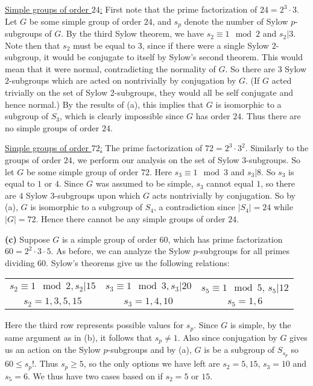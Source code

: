 \documentclass[11pt, letterpaper]{article}
\begin{document}
\underline{Simple groups of order $24$:} First note that the prime factorization of $24=2^3\cdot 3$. Let $G$ be some simple group of order $24$, and $s_p$ denote the number of Sylow $p$-subgroups of $G$. By the third Sylow theorem, we have $s_2\equiv 1\mod 2$ and $s_2 | 3$. Note then that $s_2$ must be equal to $3$, since if there were a single Sylow $2$-subgroup, it would be conjugate to itself by Sylow's second theorem. This would mean that it were normal, contradicting the normality of $G$. So there are $3$ Sylow $2$-subgroups which are acted on nontrivially by conjugation by $G$. (If $G$ acted trivially on the set of Sylow 2-subgroups, they would all be self conjugate and hence normal.) By the results of (a), this implies that $G$ is isomorphic to a subgroup of $S_3$, which is clearly impossible since $G$ has order $24$. Thus there are no simple groups of order $24$.

\underline{Simple groups of order $72$:} The prime factorization of $72=2^3\cdot3^2$. Similarly to the groups of order $24$, we perform our analysis on the set of Sylow $3$-subgroups. So let $G$ be some simple group of order $72$. Here $s_3\equiv 1\mod 3$ and $s_3|8$. So $s_3$ is equal to $1$ or $4$. Since $G$ was assumed to be simple, $s_3$ cannot equal $1$, so there are $4$ Sylow $3$-subgroups upon which $G$ acts nontrivially by conjugation. So by (a), $G$ is isomorphic to a subgroup of $S_4$, a contradiction since $|S_4|=24$ while $|G|=72$. Hence there cannot be any simple groups of order $24$.

\textbf{(c)} Suppose $G$ is a simple group of order $60$, which has prime factorization $60=2^2\cdot 3\cdot 5$. As before, we can analyze the Sylow $p$-subgroups for all primes dividing $60$. Sylow's theorems give us the following relations:

\begin{center}
    \begin{tabular}{ c c c }
         $s_2\equiv 1\mod 2, s_2 | 15$ & $s_3\equiv 1\mod 3, s_3|20$ & $s_5\equiv 1\mod 5$, $s_5|12$ \\ 
         $s_2=1,3,5,15$&$s_3=1,4,10$&$s_5=1,6$
    \end{tabular}
\end{center}

Here the third row represents possible values for $s_p$. Since $G$ is simple, by the same argument as in (b), it follows that $s_p\neq 1$. Also since conjugation by $G$ gives us an action on the Sylow $p$-subgroups and by (a), $G$ is be a subgroup of $S_{s_p}$ so $60 \leq s_p!$. Thus $s_p\geq 5$, so the only options we have left are $s_2=5, 15$, $s_3=10$ and $s_5=6$. We thus have two cases based on if $s_2=5$ or $15$.
\end{document}
